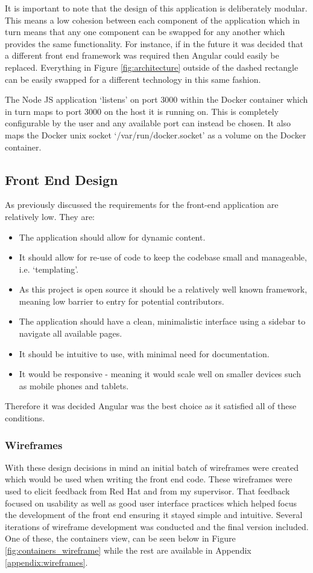 It is important to note that the design of this application is deliberately modular. This means a low cohesion between each component of the application which in turn means that any one component can be swapped for any another which provides the same functionality. For instance, if in the future it was decided that a different front end framework was required then Angular could easily be replaced. Everything in Figure \ref{fig:architecture} outside of the dashed rectangle can be easily swapped for a different technology in this same fashion.

The Node JS application `listens' on port 3000 within the \gls{Docker container} which in turn maps to port 3000 on the host it is running on. This is completely configurable by the user and any available port can instead be chosen. It also maps the Docker unix socket `/var/run/docker.socket' as a volume on the Docker container.  

\subsection{Front End Design}
\label{sub:front-end}
As previously discussed the requirements for the front-end application are relatively low. They are:

\begin{itemize}
	\item The application should allow for dynamic content.
	\item It should allow for re-use of code to keep the codebase small and manageable, i.e. `templating'.
	\item As this project is open source it should be a relatively well known framework, meaning low barrier to entry for potential contributors.
	\item The application should have a clean, minimalistic interface using a sidebar to navigate all available pages. 
	\item It should be intuitive to use, with minimal need for documentation.
	\item It would be responsive - meaning it would scale well on smaller devices such as mobile phones and tablets.
\end{itemize}

Therefore it was decided Angular was the best choice as it satisfied all of these conditions.

\subsubsection{Wireframes}
With these design decisions in mind an initial batch of wireframes were created which would be used when writing the front end code. These wireframes were used to elicit feedback from Red Hat and from my supervisor. That feedback focused on usability as well as good user interface practices which helped focus the development of the front end ensuring it stayed simple and intuitive. Several iterations of wireframe development was conducted and the final version included. One of these, the containers view, can be seen below in Figure \ref{fig:containers_wireframe} while the rest are available in Appendix \ref{appendix:wireframes}.

